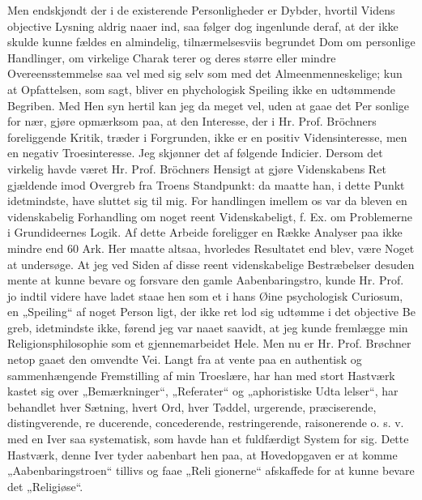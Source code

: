 \documentclass[12pt]{book}
\newcommand{\opage}[1]{\marginnote{\footnotesize\textit{[#1]}}}
\begin{document}
Men endskjøndt der i de existerende Personligheder
er Dybder, hvortil Videns objective Lysning aldrig naaer
\opage{46}\setcounter{footnote}{0}%
ind, saa følger dog ingenlunde deraf, at der ikke skulde
kunne fældes en almindelig, tilnærmelsesviis begrundet
Dom om personlige Handlinger, om virkelige Charak\-%
terer og deres større eller mindre Overeensstemmelse saa\-%
vel med sig selv som med det Almeenmenneskelige;
kun at Opfattelsen, som sagt, bliver en phychologisk %
Speiling ikke en udtømmende Begriben. Med Hen\-%
syn hertil kan jeg da meget vel, uden at gaae det Per\-%
sonlige for nær, gjøre opmærksom paa, at den Interesse,
der i Hr. Prof. Bröchners foreliggende Kritik, træder i
Forgrunden, ikke er en positiv Vidensinteresse, men en
negativ Troesinteresse. Jeg skjønner det af følgende
Indicier. Dersom det virkelig havde været Hr. Prof.
Bröchners Hensigt at gjøre Videnskabens Ret gjældende
imod Overgreb fra Troens Standpunkt: da maatte han, i
dette Punkt idetmindste, have sluttet sig til mig. For\-%
handlingen imellem os var da bleven en videnskabelig
Forhandling om noget reent Videnskabeligt, f. Ex. om
Problemerne i Grundideernes Logik. Af dette Arbeide
foreligger en Række Analyser paa ikke mindre end 60
Ark. Her maatte altsaa, hvorledes Resultatet end blev,
være Noget at undersøge. At jeg ved Siden af disse
reent videnskabelige Bestræbelser desuden mente at kunne
bevare og forsvare den gamle Aabenbaringstro, kunde Hr.
Prof. jo indtil videre have ladet staae hen som et i hans Øine
psychologisk Curiosum, en „Speiling“ af noget Person\-%
ligt, der ikke ret lod sig udtømme i det objective Be\-%
greb, idetmindste ikke, førend jeg var naaet saavidt, at
jeg kunde fremlægge min Religionsphilosophie som et
gjennemarbeidet Hele. Men nu er Hr. Prof. Brøchner
netop gaaet den omvendte Vei. Langt fra at vente paa
en authentisk og sammenhængende Fremstilling af min
Troeslære, har han med stort Hastværk kastet sig over
„Bemærkninger“, „Referater“ og „aphoristiske Udta\-%
\opage{47}\setcounter{footnote}{0}%
lelser“, har behandlet hver Sætning, hvert Ord, hver
Tøddel, urgerende, præciserende, distingverende, re\-%
ducerende, concederende, restringerende, raisonerende
o. s. v. med en Iver saa systematisk, som havde
han et fuldfærdigt System for sig. Dette Hastværk,
denne Iver tyder aabenbart hen paa, at Hovedopgaven
er at komme „Aabenbaringstroen“ tillivs og faae „Reli\-%
gionerne“ afskaffede for at kunne bevare det „Religiøse“.
\end{document}
